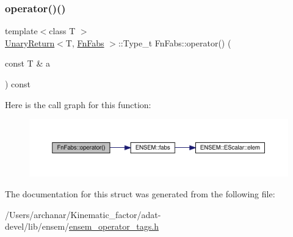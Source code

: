\subsubsection{\texorpdfstring{operator()()}{operator()()}\hspace{0.1cm}{\footnotesize\ttfamily [3/3]}}
{\footnotesize\ttfamily template$<$class T $>$ \\
\mbox{\hyperlink{structUnaryReturn}{Unary\+Return}}$<$T, \mbox{\hyperlink{structFnFabs}{Fn\+Fabs}} $>$\+::Type\+\_\+t Fn\+Fabs\+::operator() (\begin{DoxyParamCaption}\item[{const T \&}]{a }\end{DoxyParamCaption}) const\hspace{0.3cm}{\ttfamily [inline]}}

Here is the call graph for this function\+:
\nopagebreak
\begin{figure}[H]
\begin{center}
\leavevmode
\includegraphics[width=350pt]{dd/d25/structFnFabs_a0813fbaa7b8028c3880585e4095fd2ca_cgraph}
\end{center}
\end{figure}


The documentation for this struct was generated from the following file\+:\begin{DoxyCompactItemize}
\item 
/\+Users/archanar/\+Kinematic\+\_\+factor/adat-\/devel/lib/ensem/\mbox{\hyperlink{adat-devel_2lib_2ensem_2ensem__operator__tags_8h}{ensem\+\_\+operator\+\_\+tags.\+h}}\end{DoxyCompactItemize}
